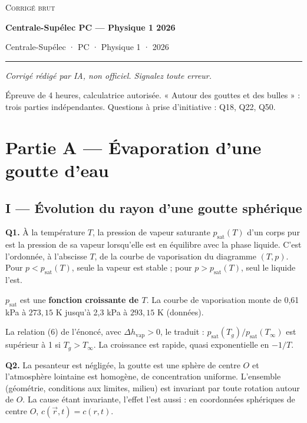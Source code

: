 \documentclass[11pt,a4paper]{article}
\begin{document}
\thispagestyle{plain}
\begin{center}
  {\small\scshape Corrigé brut}\par\smallskip
  {\LARGE\bfseries Centrale-Supélec PC — Physique 1 2026\par}\medskip
  {\large Centrale-Supélec · PC · Physique 1 · 2026\par}
\end{center}
\vspace{2pt}\hrule\vspace{8pt}

\emph{Corrigé rédigé par IA, non officiel. Signalez toute erreur.}

Épreuve de 4 heures, calculatrice autorisée. « Autour des gouttes et des bulles » : trois parties indépendantes. Questions à prise d'initiative : Q18, Q22, Q50.

\hypertarget{partie-a-uxe9vaporation-dune-goutte-deau}{%
\section{Partie A --- Évaporation d'une goutte d'eau}\label{partie-a-uxe9vaporation-dune-goutte-deau}}

\hypertarget{i-uxe9volution-du-rayon-dune-goutte-sphuxe9rique}{%
\subsection{I --- Évolution du rayon d'une goutte sphérique}\label{i-uxe9volution-du-rayon-dune-goutte-sphuxe9rique}}

\textbf{Q1.} À la température \(T\), la pression de vapeur saturante \(p_{\text{sat}}(T)\) d'un corps pur est la pression de sa vapeur lorsqu'elle est en équilibre avec la phase liquide. C'est l'ordonnée, à l'abscisse \(T\), de la courbe de vaporisation du diagramme \((T,p)\). Pour \(p<p_{\text{sat}}(T)\), seule la vapeur est stable ; pour \(p>p_{\text{sat}}(T)\), seul le liquide l'est.

\(p_{\text{sat}}\) est une \textbf{fonction croissante de \(T\)}. La courbe de vaporisation monte de 0,61 kPa à \(273{,}15\) K jusqu'à 2,3 kPa à \(293{,}15\) K (données).

La relation (6) de l'énoncé, avec \(\Delta h_{\text{vap}}>0\), le traduit : \(p_{\text{sat}}(T_g)/p_{\text{sat}}(T_\infty)\) est supérieur à 1 si \(T_g>T_\infty\). La croissance est rapide, quasi exponentielle en \(-1/T\).

\textbf{Q2.} La pesanteur est négligée, la goutte est une sphère de centre \(O\) et l'atmosphère lointaine est homogène, de concentration uniforme. L'ensemble (géométrie, conditions aux limites, milieu) est invariant par toute rotation autour de \(O\). La cause étant invariante, l'effet l'est aussi : en coordonnées sphériques de centre \(O\), \(c(\vec r,t)=c(r,t)\).
\end{document}
